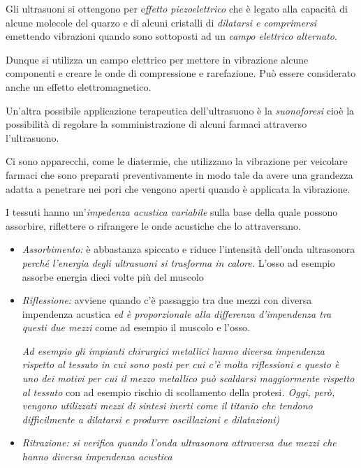 Gli ultrasuoni si ottengono per e\emph{ffetto piezoelettrico} che è
legato alla capacità di alcune molecole del quarzo e di alcuni cristalli
di \emph{dilatarsi e comprimersi} emettendo vibrazioni quando sono
sottoposti ad un \emph{campo elettrico alternato}.

Dunque si utilizza un campo elettrico per mettere in vibrazione alcune
componenti e creare le onde di compressione e rarefazione. Può essere
considerato anche un effetto elettromagnetico.

Un'altra possibile applicazione terapeutica dell'ultrasuono è la
\emph{suonoforesi} cioè la possibilità di regolare la somministrazione
di alcuni farmaci attraverso l'ultrasuono.

Ci sono apparecchi, come le diatermie, che utilizzano la vibrazione per
veicolare farmaci che sono preparati preventivamente in modo tale da
avere una grandezza adatta a penetrare nei pori che vengono aperti
quando è applicata la vibrazione.

I tessuti hanno un'\emph{impedenza acustica variabile} sulla base della
quale possono assorbire, riflettere o rifrangere le onde acustiche che
lo attraversano.

\begin{itemize}
\item
  \emph{Assorbimento:} è abbastanza spiccato e riduce l'intensità
  dell'onda ultrasonora \emph{perché l'energia degli ultrasuoni si
  trasforma in calore.} L'osso ad esempio assorbe energia dieci volte
  più del muscolo

\item
  \emph{\emph{Riflessione:}} avviene quando c'è passaggio tra due mezzi
  con diversa impendenza acustica \emph{ed è proporzionale alla
  differenza d'impendenza tra questi due mezzi} come ad esempio il
  muscolo e l'osso\emph{.}

\emph{Ad esempio gli impianti chirurgici metallici hanno diversa
impendenza rispetto al tessuto in cui sono posti per cui c'è molta
riflessioni e questo è uno dei motivi per cui il mezzo metallico può
scaldarsi maggiormente rispetto al tessuto} con ad esempio rischio di
scollamento della protesi\emph{. Oggi, però, vengono utilizzati mezzi di
sintesi inerti come il titanio che tendono difficilmente a dilatarsi e
produrre oscillazioni e dilatazioni) }

\item
  \emph{Ritrazione: si verifica quando l'onda ultrasonora attraversa due
  mezzi che hanno diversa impendenza acustica}
\end{itemize}

